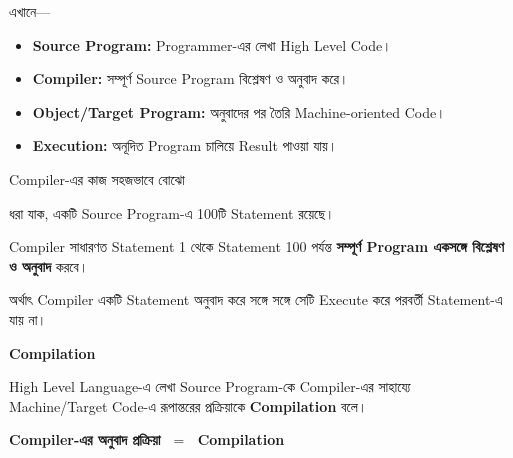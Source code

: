 এখানে—

\begin{itemize}

\item \textbf{Source Program:}
Programmer-এর লেখা High Level Code।

\item \textbf{Compiler:}
সম্পূর্ণ Source Program বিশ্লেষণ ও অনুবাদ করে।

\item \textbf{Object/Target Program:}
অনুবাদের পর তৈরি Machine-oriented Code।

\item \textbf{Execution:}
অনূদিত Program চালিয়ে Result পাওয়া যায়।

\end{itemize}

\begin{examplebox}{Compiler-এর কাজ সহজভাবে বোঝো}

ধরা যাক, একটি Source Program-এ 100টি Statement রয়েছে।

Compiler সাধারণত Statement 1 থেকে Statement 100 পর্যন্ত
\textbf{সম্পূর্ণ Program একসঙ্গে বিশ্লেষণ ও অনুবাদ} করবে।

অর্থাৎ Compiler একটি Statement অনুবাদ করে সঙ্গে সঙ্গে সেটি
Execute করে পরবর্তী Statement-এ যায় না।

\end{examplebox}


\begin{definitionbox}

\textbf{\color{darkTeal}Compilation}

High Level Language-এ লেখা Source Program-কে Compiler-এর
সাহায্যে Machine/Target Code-এ রূপান্তরের প্রক্রিয়াকে
\textbf{Compilation} বলে।

\end{definitionbox}

\begin{center}

\textbf{
Compiler-এর অনুবাদ প্রক্রিয়া
\(\;=\;\)
Compilation
}

\end{center}


